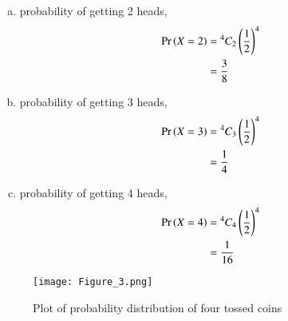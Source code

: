 \documentclass[journal,12pt,twocolumn]{IEEEtran}
\begin{document}
\begin{enumerate}[(i)]
\begin{enumerate}[(a)]
    \item probability of getting 2 heads,
        \begin{align}
            \begin{split}
                \Pr\left(X=2\right) &= {^4C_2}\left(\frac{1}{2}\right)^4\\
                &=\frac{3}{8}
            \end{split}
        \end{align}

    \item probability of getting 3 heads,
        \begin{align}
            \begin{split}
                \Pr\left(X=3\right) &= {^4C_3}\left(\frac{1}{2}\right)^4\\
                &=\frac{1}{4}
            \end{split}
        \end{align}

\item probability of getting 4 heads,
        \begin{align}
            \begin{split}
                \Pr\left(X=4\right) &= {^4C_4}\left(\frac{1}{2}\right)^4\\
                &=\frac{1}{16}
            \end{split}
        \end{align}
\end{enumerate}

\begin{figure}[h!]
    \centering
    \texttt{[image: Figure\_3.png]}
    \caption{Plot of probability distribution of four tossed coins}
    \label{fig:Four coins}
\end{figure}
\end{enumerate}

\vspace{2in}

\begin{table}[h!]
\centering
\caption{Table}
\end{table}
\end{document}
